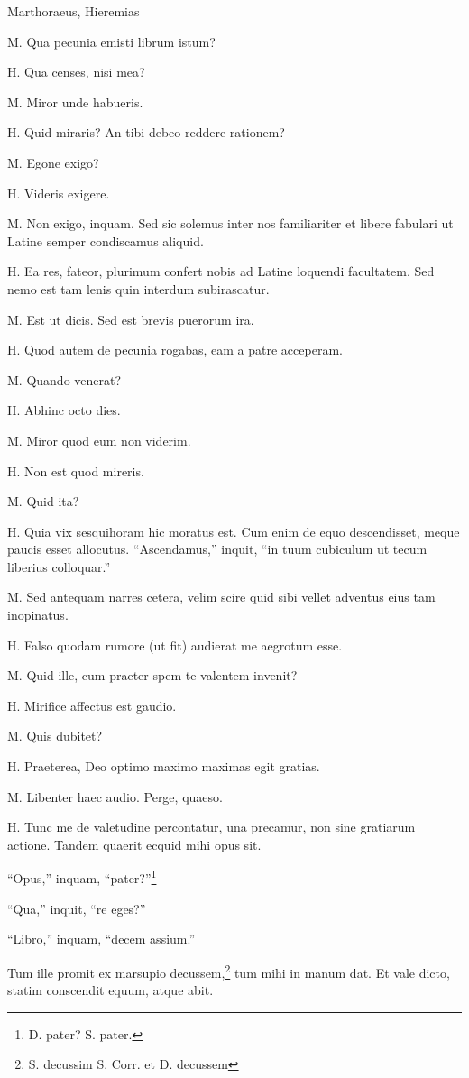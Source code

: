 \documentclass{article}
\begin{document}
Marthoraeus, Hieremias

M. Qua pecunia emisti librum istum?

H. Qua censes, nisi mea?

M. Miror unde habueris.

H. Quid miraris? An tibi debeo reddere rationem?

M. Egone exigo?

H. Videris exigere.

M. Non exigo, inquam. Sed sic solemus inter nos familiariter et libere fabulari ut Latine semper condiscamus aliquid.

H. Ea res, fateor, plurimum confert nobis ad Latine loquendi facultatem. Sed nemo est tam lenis quin interdum subirascatur.

M. Est ut dicis. Sed est brevis puerorum ira.

H. Quod autem de pecunia rogabas, eam a patre acceperam.

M. Quando venerat?

H. Abhinc octo dies.

M. Miror quod eum non viderim.

H. Non est quod mireris.

M. Quid ita?

H. Quia vix sesquihoram hic moratus est. Cum enim de equo descendisset, meque paucis esset allocutus. ``Ascendamus,'' inquit, ``in tuum cubiculum ut tecum liberius colloquar.''

M. Sed antequam narres cetera, velim scire quid sibi vellet adventus eius tam inopinatus.

H. Falso quodam rumore (ut fit) audierat me aegrotum esse.

M. Quid ille, cum praeter spem te valentem invenit?

H. Mirifice affectus est gaudio.

M. Quis dubitet?

H. Praeterea, Deo optimo maximo maximas egit gratias.

M. Libenter haec audio. Perge, quaeso.

H. Tunc me de valetudine percontatur, una precamur, non sine gratiarum actione. Tandem quaerit ecquid mihi opus sit.

``Opus,'' inquam, ``pater?''\footnote{D. pater? S. pater.}

``Qua,'' inquit, ``re eges?''

``Libro,'' inquam, ``decem assium.''

Tum ille promit ex marsupio decussem,\footnote{S. decussim S. Corr. et D. decussem} tum mihi in manum dat. Et vale dicto, statim conscendit equum, atque abit.
\end{document}
